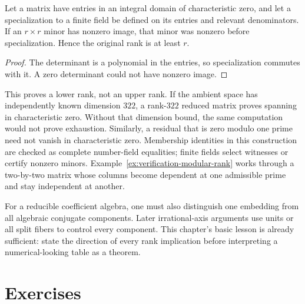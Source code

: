\begin{proposition}
Let a matrix have entries in an integral domain of characteristic zero,
and let a specialization to a finite field be defined on its entries
and relevant denominators. If an $r\times r$ minor has nonzero image,
that minor was nonzero before specialization. Hence the original rank
is at least $r$.
\end{proposition}
\begin{proof}
The determinant is a polynomial in the entries, so specialization
commutes with it. A zero determinant could not have nonzero image.
\end{proof}

This proves a lower rank, not an upper rank. If the ambient space has
independently known dimension $322$, a rank-$322$ reduced matrix proves
spanning in characteristic zero. Without that dimension bound, the same
computation would not prove exhaustion. Similarly, a residual that is
zero modulo one prime need not vanish in characteristic zero. Membership
identities in this construction are checked as complete number-field
equalities; finite fields select witnesses or certify nonzero minors.
Example~\ref{ex:verification-modular-rank} works through a
two-by-two matrix whose columns become dependent at one admissible
prime and stay independent at another.

For a reducible coefficient algebra, one must also distinguish one
embedding from all algebraic conjugate components. Later irrational-axis
arguments use units or all split fibers to control every component.
This chapter's basic lesson is already sufficient: state the direction
of every rank implication before interpreting a numerical-looking
table as a theorem.

\section{Exercises}

